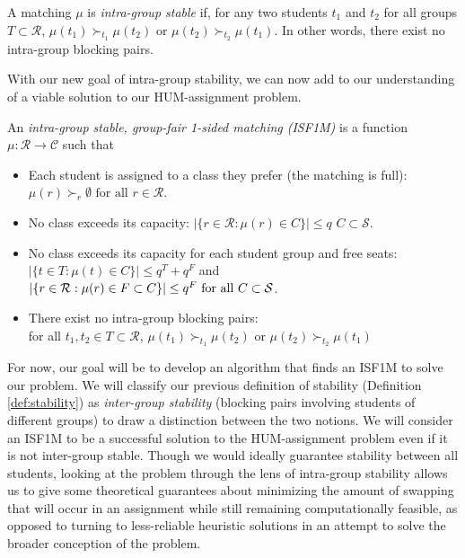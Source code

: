\begin{definition} \label{def:intra}
  A matching $\mu$ is \emph{intra-group stable} if, for any two students $t_1$
  and $t_2$ for all
  groups $T \subset \mathcal{R}$, $\mu(t_1) \succ_{t_1} \mu(t_2)$  or $\mu(t_2)
  \succ_{t_2}
    \mu(t_1)$. In other words, there exist no intra-group blocking pairs.
\end{definition}

With our new goal of intra-group stability, we can now add to our
understanding of a viable solution to our HUM-assignment problem.

\begin{definition} \label{def:ispim}
  An \emph{intra-group stable, group-fair 1-sided matching (ISF1M)} is a function $\mu :
  \mathcal{R} \rightarrow \mathcal{C}$ such that
  \begin{itemize}
    \item
          Each student is assigned to a class they prefer (the matching is full): \\
          $\mu(r) \succ_r \emptyset \text{ for all }r \in \mathcal{R}$.
    \item
          No class exceeds its capacity:  
          $|\{r \in \mathcal{R} : \mu(r) \in C\}| \leq q$  $C \subset
      \mathcal{S}$.
    \item
          No class exceeds its capacity for each student group and free seats: \\ 
           $|\{t \in T : \mu(t) \in C\}| \leq q^T + q^F$ and
           $|\{r \in \mathcal{R} : \mu(r) \in F \subset C\}| \leq q^F \\ \text{ for all } C
      \subset \mathcal{S}$.
    \item
          There exist no intra-group blocking pairs: \\ for all $t_1, t_2 \in T
          \subset \mathcal{R}$, 
          $\mu(t_1) \succ_{t_1} \mu(t_2)$ or $\mu(t_2) \succ_{t_2} \mu(t_1)$
  \end{itemize}
\end{definition}

For now, our goal will be to develop an algorithm that finds an ISF1M to solve
our problem. We will classify our previous definition of stability (Definition
\ref{def:stability}) as \textit{inter-group stability} (blocking pairs involving
students of different groups) to draw a distinction between the two notions.
We will consider an ISF1M to be a successful solution to the
HUM-assignment problem even if it is not inter-group stable. Though we would
ideally guarantee stability between all students, looking at the
problem through the lens of intra-group stability allows us to give some
theoretical guarantees about minimizing the amount of swapping that will occur
in an assignment while still remaining computationally feasible, as opposed to turning
to less-reliable heuristic solutions in an attempt to solve the broader conception of the problem.

